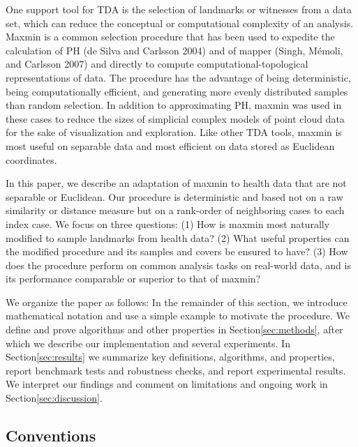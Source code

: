 \documentclass{article}
\begin{document}
One support tool for TDA is the selection of landmarks or witnesses from
a data set, which can reduce the conceptual or computational complexity
of an analysis. Maxmin is a common selection procedure that has been
used to expedite the calculation of PH (de Silva and Carlsson 2004) and
of mapper (Singh, Mémoli, and Carlsson 2007) and directly to compute
computational-topological representations of data. The procedure has the
advantage of being deterministic, being computationally efficient, and
generating more evenly distributed samples than random selection. In
addition to approximating PH, maxmin was used in these cases to reduce
the sizes of simplicial complex models of point cloud data for the sake
of visualization and exploration. Like other TDA tools, maxmin is most
useful on separable data and most efficient on data stored as Euclidean
coordinates.

In this paper, we describe an adaptation of maxmin to health data that
are not separable or Euclidean. Our procedure is deterministic and based
not on a raw similarity or distance measure but on a rank-order of
neighboring cases to each index case. We focus on three questions: (1)
How is maxmin most naturally modified to sample landmarks from health
data? (2) What useful properties can the modified procedure and its
samples and covers be ensured to have? (3) How does the procedure
perform on common analysis tasks on real-world data, and is its
performance comparable or superior to that of maxmin?

We organize the paper as follows: In the remainder of this section, we
introduce mathematical notation and use a simple example to motivate the
procedure. We define and prove algorithms and other properties in
Section\nbs\ref{sec:methods}, after which we describe our implementation
and several experiments. In Section\nbs\ref{sec:results} we summarize
key definitions, algorithms, and properties, report benchmark tests and
robustness checks, and report experimental results. We interpret our
findings and comment on limitations and ongoing work in
Section\nbs\ref{sec:discussion}.

\hypertarget{conventions}{%
\subsection{Conventions}\label{conventions}}
\end{document}

